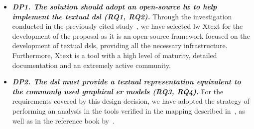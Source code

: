 \begin{itemize}
    \item\textit{\textbf{DP1. The solution should adopt an open-source \ac{lw} to help implement the textual \ac{dsl} (RQ1, RQ2).}}
     Through the investigation conducted in the previously cited study~\cite{Lopes:2019}, we have selected \ac{lw} Xtext for the development of the proposal as it is an open-source framework focused on the development of textual \acp{dsl}, providing all the necessary infrastructure.
     Furthermore, Xtext is a tool with a high level of maturity, detailed documentation and an extremely active community.
    
    \item\textit{\textbf{DP2. The \ac{dsl} must provide a textual representation equivalent to the commonly used graphical \ac{er} models (RQ3, RQ4).}}
    For the requirements covered by this design decision, we have adopted the strategy of performing an analysis in the tools verified in the mapping described in~\cite{Lopes:2019}, as well as in the reference book by~\cite{Heuser:2009}.
    

\end{itemize}
